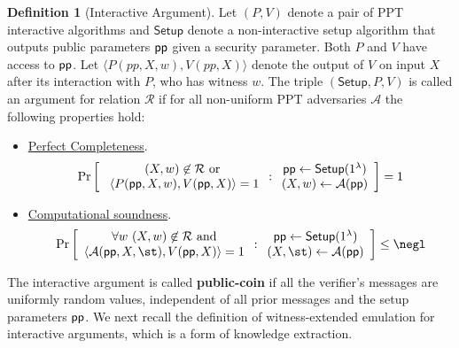 \documentclass{article}
\theoremstyle{definition}
\newtheorem{definition}{Definition}
\begin{document}
\begin{definition} [Interactive Argument]
Let $(P, V)$ denote a pair of PPT interactive algorithms and $\textsf{Setup}$ denote a non-interactive setup algorithm that outputs public parameters $\textsf{pp}$ given a security parameter. Both $P$ and $V$ have access to $\textsf{pp}$. Let $\langle P(pp, X, w), V(pp, X) \rangle$ denote the output of $V$ on input $X$ after its interaction with $P$, who has witness $w$. The triple $(\textsf{Setup}, P, V)$ is called an argument for relation $\mathcal{R}$ if for all non-uniform PPT adversaries $\mathcal{A}$ the following properties hold: 

\begin{itemize}
\item \underline{Perfect Completeness}. 
\[
\Pr \left[
\begin{array}{c}
        (X, w) \not \in  \mathcal{R} \ \text{or} \\
         \ \langle P(\textsf{pp}, X, w), V(\textsf{pp}, X) \rangle = 1 \\
\end{array}
:
\begin{array}{c}
             \textsf{pp} \leftarrow \textsf{Setup}(1^\lambda) \\
             (X, w) \leftarrow \mathcal{A}(\textsf{pp}) \\
\end{array} 
\right]  = 1 
 \]

\item \underline{Computational soundness}. 
\[
\Pr \left[
\begin{array}{c}
        \forall w \ (X, w) \not\in  \mathcal{R} \ \text{and} \\ 
         \langle \mathcal{A}(\params, X, \st), V(\params, X) \rangle = 1 
\end{array}
:
\begin{array}{c}
             \params \leftarrow \textsf{Setup}(1^\lambda) \\
             (X, \st) \leftarrow \mathcal{A}(\params) \\
\end{array}
        \right] \leq \negl
\]
\end{itemize} 
\end{definition} 

The interactive argument is called \textbf{public-coin} if all the verifier's messages are uniformly random values, independent of all prior messages and the setup parameters $\textsf{pp}$. 
We next recall the definition of witness-extended emulation for interactive arguments, which is a form of knowledge extraction.  
\end{document}
